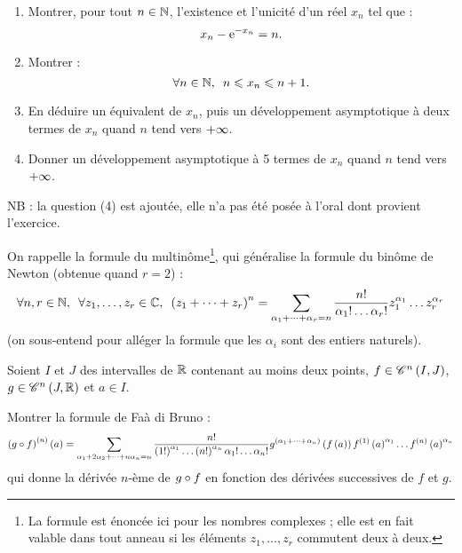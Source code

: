 \begin{exo}
\begin{enumerate}
\item Montrer, pour tout \(n\in\mathbb{N}\), l'existence et l'unicité d'un réel \(x_n\) tel que : \[x_n-\mathrm{e}^{-x_n}=n.\]

\item Montrer : \[\quantifs{\forall n\in\N}n\leq x_n\leq n+1.\]

\item En déduire un équivalent de \(x_n\), puis un développement asymptotique à deux termes de \(x_n\) quand \(n\) tend vers \(+\infty\). \\

\item Donner un développement asymptotique à 5 termes de \(x_n\) quand \(n\) tend vers \(+\infty\).
\end{enumerate}

NB : la question (4) est ajoutée, elle n'a pas été posée à l'oral dont provient l'exercice.
\end{exo}

\begin{corr}
\end{corr}

\begin{exo}[Exercice 17]
On rappelle la formule du multinôme\footnote{La formule est énoncée ici pour les nombres complexes ; elle est en fait valable dans tout anneau si les éléments \(z_1,\dots,z_r\) commutent deux à deux.}, qui généralise la formule du binôme de Newton (obtenue quand \(r=2\)) : \[\quantifs{\forall n,r\in\N;\forall z_1,\dots,z_r\in\C}\paren{z_1+\dots+z_r}^n=\sum_{\alpha_1+\dots+\alpha_r=n}\dfrac{n!}{\alpha_1!\dots\alpha_r!}z_1^{\alpha_1}\dots z_r^{\alpha_r}\] (on sous-entend pour alléger la formule que les \(\alpha_i\) sont des entiers naturels).

Soient \(I\) et \(J\) des intervalles de \(\mathbb{R}\) contenant au moins deux points, \(f\in\mathscr{C}^{n}\left(I,J\right)\), \(g\in\mathscr{C}^{n}\left(J,\mathbb{R}\right)\) et \(a\in I\).

Montrer la formule de Faà di Bruno : \[\left(g\circ f\right)^{\left(n\right)}\left(a\right)=\sum_{\alpha_1+2\alpha_2+\dots+n\alpha_n=n}\dfrac{n!}{\left(1!\right)^{\alpha_1}\dots\left(n!\right)^{\alpha_n}\alpha_1!\dots\alpha_n!}g^{\left(\alpha_1+\dots+\alpha_n\right)}\left(f\left(a\right)\right)f^{\left(1\right)}\left(a\right)^{\alpha_1}\dots f^{\left(n\right)}\left(a\right)^{\alpha_n}\] qui donne la dérivée \(n\)-ème de \(g\circ f\) en fonction des dérivées successives de \(f\) et \(g\).
\end{exo}

